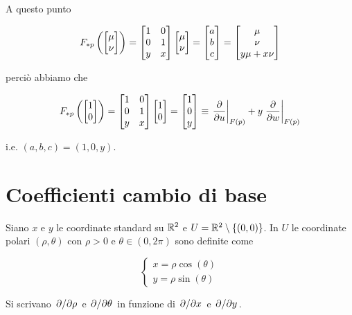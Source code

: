 A questo punto

\begin{equation}
	F_{*p} \left( \bmqty{ \mu \\ \nu } \right) = \bmqty{ 1 & 0 \\ 0 & 1 \\ y & x } \bmqty{ \mu \\ \nu } %
	= \bmqty{ a \\ b \\ c } %
	= \bmqty{ \mu \\ \nu \\ y \mu + x \nu }
\end{equation}

perciò abbiamo che

\begin{equation}
	F_{*p} \left( \bmqty{ 1 \\ 0 } \right) = \bmqty{ 1 & 0 \\ 0 & 1 \\ y & x } \bmqty{ 1 \\ 0 } %
	= \bmqty{ 1 \\ 0 \\ y } %
	\equiv \eval{\pdv{u}}_{F(p)} + y \eval{\pdv{w}}_{F(p)}
\end{equation}

i.e. $ (a,b,c) = (1,0,y) $.

\newpage

%

\section{Coefficienti cambio di base}\label{es2-9}

\begin{tcolorbox}
	Siano $ x $ e $ y $ le coordinate standard su $ \mathbb{R}^{2} $ e $ U = \mathbb{R}^{2} \setminus \{(0,0)\} $. In $ U $ le coordinate polari $ (\rho, \theta) $ con $ \rho > 0 $ e $ \theta \in (0,2\pi) $ sono definite come
	
	\begin{equation}
		\begin{cases}
			x = \rho \cos(\theta)\\
			y = \rho \sin(\theta)
		\end{cases}
	\end{equation}
	
	Si scrivano $ \pdv*{\rho} $ e $ \pdv*{\theta} $ in funzione di $ \pdv*{x} $ e $ \pdv*{y} $.
\end{tcolorbox}

